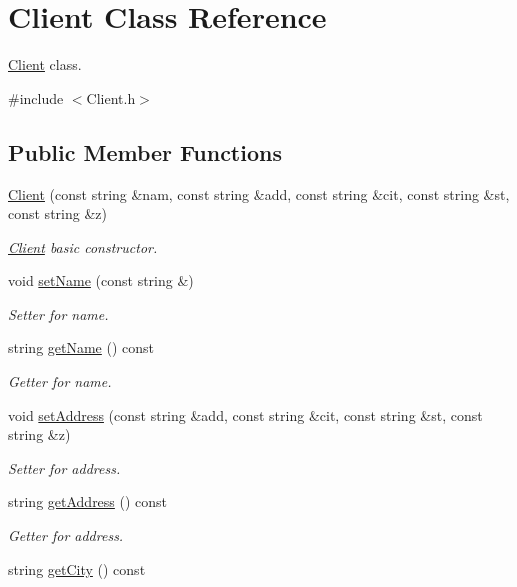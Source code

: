 \hypertarget{classClient}{}\section{Client Class Reference}
\label{classClient}


\hyperlink{classClient}{Client} class.  




{\ttfamily \#include $<$Client.\+h$>$}

\subsection*{Public Member Functions}
\begin{DoxyCompactItemize}
\item 
\hyperlink{classClient_a2581a22e25217aafda77c410ee67092c}{Client} (const string \&nam, const string \&add, const string \&cit, const string \&st, const string \&z)
\begin{DoxyCompactList}\small\item\em \hyperlink{classClient}{Client} basic constructor. \end{DoxyCompactList}\item 
void \hyperlink{classClient_ab78b7ecbedb2d6fc0e0df3dfa8c973bc}{set\+Name} (const string \&)\hypertarget{classClient_ab78b7ecbedb2d6fc0e0df3dfa8c973bc}{}\label{classClient_ab78b7ecbedb2d6fc0e0df3dfa8c973bc}

\begin{DoxyCompactList}\small\item\em Setter for name. \end{DoxyCompactList}\item 
string \hyperlink{classClient_a28a677584ad4793b50b31c2e75039e2c}{get\+Name} () const \hypertarget{classClient_a28a677584ad4793b50b31c2e75039e2c}{}\label{classClient_a28a677584ad4793b50b31c2e75039e2c}

\begin{DoxyCompactList}\small\item\em Getter for name. \end{DoxyCompactList}\item 
void \hyperlink{classClient_a69b7a62c15ec787ae86bb66ce4ad312a}{set\+Address} (const string \&add, const string \&cit, const string \&st, const string \&z)
\begin{DoxyCompactList}\small\item\em Setter for address. \end{DoxyCompactList}\item 
string \hyperlink{classClient_a291fb22c4fccb2a6b182c355078553ed}{get\+Address} () const 
\begin{DoxyCompactList}\small\item\em Getter for address. \end{DoxyCompactList}\item 
string \hyperlink{classClient_ad92aa60043bd899cdad19b9ca6a77a2e}{get\+City} () const \hypertarget{classClient_ad92aa60043bd899cdad19b9ca6a77a2e}{}\label{classClient_ad92aa60043bd899cdad19b9ca6a77a2e}


\end{DoxyCompactItemize}
